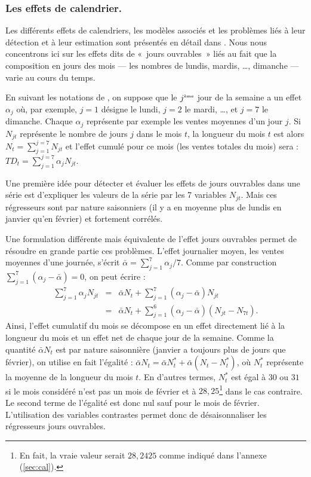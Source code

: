 \documentclass[12pt, a4paper, french]{article}
\begin{document}
\subsubsection{Les effets de calendrier.}

Les différents effets de calendriers, les modèles associés et les problèmes liés à leur détection et à leur estimation sont présentés en détail dans \cite{L2018}. Nous nous concentrons ici sur les effets dits de «~jours ouvrables~» liés au fait que la composition en jours des mois --- les nombres de lundis, mardis, \dots, dimanche --- varie au cours du temps.

En suivant les notations de \cite{FMBOC1998}, on suppose que le $j^{\mbox{\tiny {\`{e}me}}}$ jour de la semaine a un effet $\alpha_j$ où, par exemple, $j=1$ désigne le lundi, $j=2$ le mardi, \dots, et $j=7$ le dimanche. Chaque $\alpha_j$ représente par exemple les ventes moyennes d'un jour $j$. Si $N_{jt}$ représente le nombre de jours $j$ dans le mois $t$, la longueur du mois $t$ est alors $N_t = \sum_{j=1}^{j=7} N_{jt}$ et l'effet cumulé pour ce mois (les ventes totales du mois) sera :
$TD_t = \sum_{j=1}^{j=7} \alpha_j N_{jt}$.

Une première idée pour détecter et évaluer les effets de jours ouvrables dans une série est d'expliquer les valeurs de la série par les 7 variables $N_{jt}$. Mais ces régresseurs sont par nature saisonniers (il y a en moyenne plus de lundis en janvier qu'en février) et fortement corrélés. 

Une formulation différente mais équivalente de l'effet jours ouvrables permet de résoudre en grande partie ces problèmes. L'effet journalier moyen, les ventes moyennes d'une journée, s'écrit $\bar{\alpha} = \sum_{j=1}^7 \alpha_j /7$. 
Comme par construction $\sum_{j=1}^7 \left(\alpha_j-\bar{\alpha}\right) = 0$, on peut écrire :
\begin{eqnarray*}
\sum_{j=1}^7 \alpha_j N_{jt} & = & \bar{\alpha}N_t + \sum_{j=1}^7 \left(\alpha_j-\bar{\alpha}\right) N_{jt} \nonumber \\
& = &  \bar{\alpha}N_t + \sum_{j=1}^6 \left(\alpha_j-\bar{\alpha}\right) \left(N_{jt} - N_{7t}\right).
\end{eqnarray*}
Ainsi, l'effet cumulatif du mois se décompose en un effet directement lié à la longueur du mois et un effet net de chaque jour de la semaine. Comme la quantité $\bar{\alpha}N_t$ est par nature saisonnière (janvier a toujours plus de jours que février), on utilise en fait l'égalité : $\bar{\alpha}N_t = \bar{\alpha}N_t^* + \bar{\alpha}\left(N_t-N_t^*\right)$, où $N_t^*$
représente la moyenne de la longueur du mois $t$. En d'autres termes, $N_t^*$  est égal à $30$ ou $31$ si le mois considéré n'est pas un mois de février et à $28,25$\footnote{En fait, la vraie valeur serait $28,2425$ comme indiqué dans l'annexe (\ref{sec:cal}).} dans le cas contraire. Le second terme de l'égalité est donc nul sauf pour le mois de février. L'utilisation des variables contrastes permet donc de désaisonnaliser les régresseurs jours ouvrables.
\end{document}
